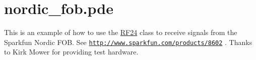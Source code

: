 \hypertarget{nordic_fob_8pde-example}{\section{nordic\+\_\+fob.\+pde}
}
This is an example of how to use the \hyperlink{class_r_f24}{R\+F24} class to receive signals from the Sparkfun Nordic F\+O\+B. See \href{http://www.sparkfun.com/products/8602}{\tt http\+://www.\+sparkfun.\+com/products/8602} . Thanks to Kirk Mower for providing test hardware.


\begin{DoxyCodeInclude}
\end{DoxyCodeInclude}
 